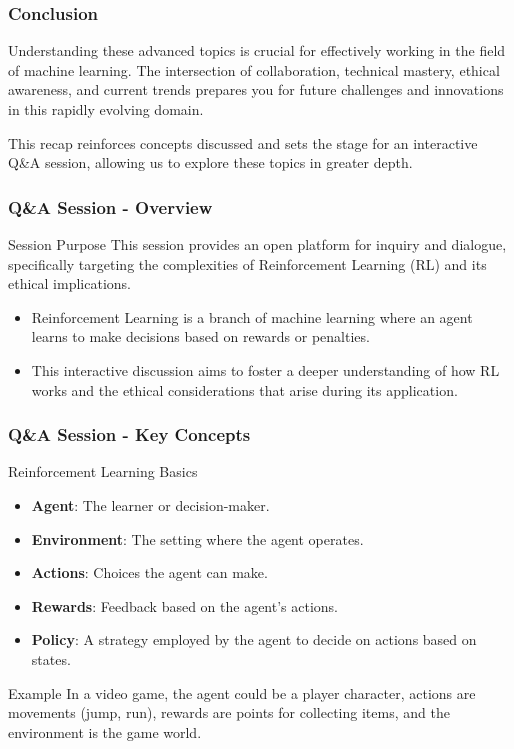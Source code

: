 \documentclass[aspectratio=169]{beamer}
\begin{document}
\begin{frame}[fragile]
    \frametitle{Conclusion}
    Understanding these advanced topics is crucial for effectively working in the field of machine learning. 
    The intersection of collaboration, technical mastery, ethical awareness, and current trends prepares you for future challenges and innovations in this rapidly evolving domain.
    
    This recap reinforces concepts discussed and sets the stage for an interactive Q&A session, allowing us to explore these topics in greater depth.
\end{frame}

\begin{frame}[fragile]
    \frametitle{Q\&A Session - Overview}
    \begin{block}{Session Purpose}
        This session provides an open platform for inquiry and dialogue, specifically targeting the complexities of Reinforcement Learning (RL) and its ethical implications. 
    \end{block}
    \begin{itemize}
        \item Reinforcement Learning is a branch of machine learning where an agent learns to make decisions based on rewards or penalties.
        \item This interactive discussion aims to foster a deeper understanding of how RL works and the ethical considerations that arise during its application.
    \end{itemize}
\end{frame}

\begin{frame}[fragile]
    \frametitle{Q\&A Session - Key Concepts}
    \begin{block}{Reinforcement Learning Basics}
        \begin{itemize}
            \item \textbf{Agent}: The learner or decision-maker.
            \item \textbf{Environment}: The setting where the agent operates.
            \item \textbf{Actions}: Choices the agent can make.
            \item \textbf{Rewards}: Feedback based on the agent's actions.
            \item \textbf{Policy}: A strategy employed by the agent to decide on actions based on states.
        \end{itemize}
    \end{block}
    \begin{block}{Example}
        In a video game, the agent could be a player character, actions are movements (jump, run), rewards are points for collecting items, and the environment is the game world.
    \end{block}
\end{frame}
\end{document}
